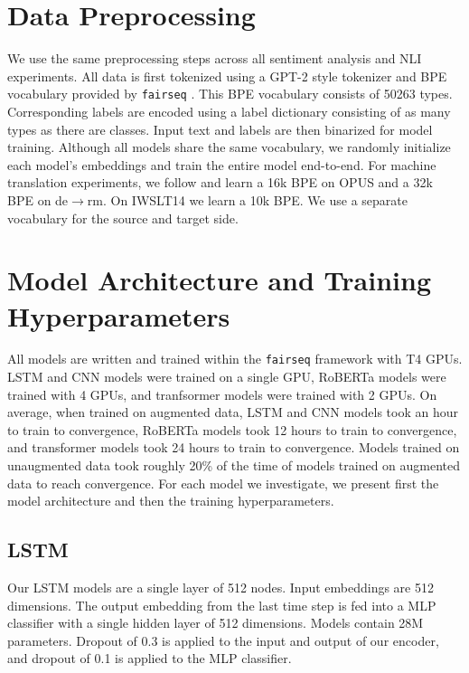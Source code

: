 \section{Data Preprocessing}
\label{app:preprocess}
We use the same preprocessing steps across all sentiment analysis and NLI experiments.
All data is first tokenized using a GPT-2 style tokenizer and BPE vocabulary provided by \texttt{fairseq} \citep{ott2019fairseq}.
This BPE vocabulary consists of 50263 types. 
Corresponding labels are encoded using a label dictionary consisting of as many types as there are classes.
Input text and labels are then binarized for model training. 
Although all models share the same vocabulary, we randomly initialize each model's embeddings and train the entire model end-to-end.
For machine translation experiments, we follow \citealt{Muller2019DomainRI} and learn a 16k BPE on OPUS and a 32k BPE on de$\to$rm. 
On IWSLT14 we learn a 10k BPE.
We use a separate vocabulary for the source and target side.

\section{Model Architecture and Training Hyperparameters}
\label{app:hyperparams}


All models are written and trained within the \texttt{fairseq} framework \citep{ott2019fairseq} with T4 GPUs.
LSTM and CNN models were trained on a single GPU, RoBERTa models were trained with 4 GPUs, and tranfsormer models were trained with 2 GPUs. 
On average, when trained on augmented data, LSTM and CNN models took an hour to train to convergence, RoBERTa models took 12 hours to train to convergence, and transformer models took 24 hours to train to convergence. 
Models trained on unaugmented data took roughly 20\% of the time of models trained on augmented data to reach convergence. 
For each model we investigate, we present first the model architecture and then the training hyperparameters.

\subsection{LSTM}
\label{subapp:lstms}
Our LSTM models are a single layer of 512 nodes. 
Input embeddings are 512 dimensions.
The output embedding from the last time step is fed into a MLP classifier with a single hidden layer of 512 dimensions.
Models contain 28M parameters.
Dropout of 0.3 is applied to the input and output of our encoder, and dropout of 0.1 is applied to the MLP classifier.

